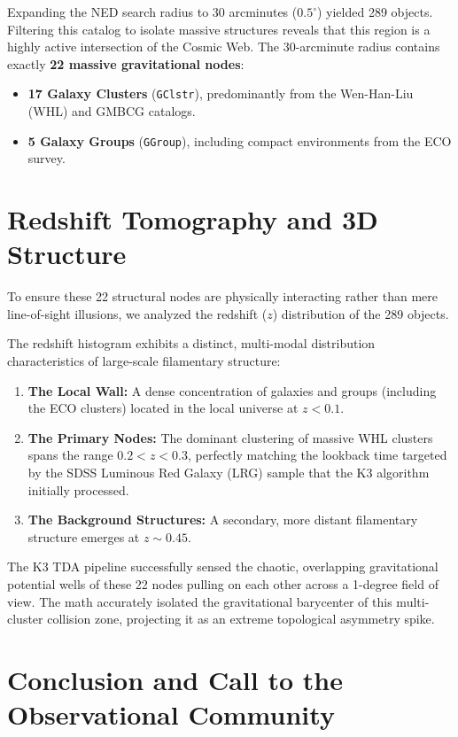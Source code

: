 \documentclass[aps,prd,twocolumn,nofootinbib,superscriptaddress,10pt]{revtex4-2}
\begin{document}
Expanding the NED search radius to 30 arcminutes ($0.5^\circ$) yielded 289 objects. Filtering this catalog to isolate massive structures reveals that this region is a highly active intersection of the Cosmic Web. The 30-arcminute radius contains exactly \textbf{22 massive gravitational nodes}:
\begin{itemize}
    \item \textbf{17 Galaxy Clusters} (\texttt{GClstr}), predominantly from the Wen-Han-Liu (WHL) and GMBCG catalogs.
    \item \textbf{5 Galaxy Groups} (\texttt{GGroup}), including compact environments from the ECO survey.
\end{itemize}

\section{Redshift Tomography and 3D Structure}

To ensure these 22 structural nodes are physically interacting rather than mere line-of-sight illusions, we analyzed the redshift ($z$) distribution of the 289 objects.

The redshift histogram exhibits a distinct, multi-modal distribution characteristics of large-scale filamentary structure:
\begin{enumerate}
    \item \textbf{The Local Wall:} A dense concentration of galaxies and groups (including the ECO clusters) located in the local universe at $z < 0.1$.
    \item \textbf{The Primary Nodes:} The dominant clustering of massive WHL clusters spans the range $0.2 < z < 0.3$, perfectly matching the lookback time targeted by the SDSS Luminous Red Galaxy (LRG) sample that the K3 algorithm initially processed.
    \item \textbf{The Background Structures:} A secondary, more distant filamentary structure emerges at $z \sim 0.45$.
\end{enumerate}

The K3 TDA pipeline successfully sensed the chaotic, overlapping gravitational potential wells of these 22 nodes pulling on each other across a 1-degree field of view. The math accurately isolated the gravitational barycenter of this multi-cluster collision zone, projecting it as an extreme topological asymmetry spike.

\section{Conclusion and Call to the Observational Community}
\end{document}
